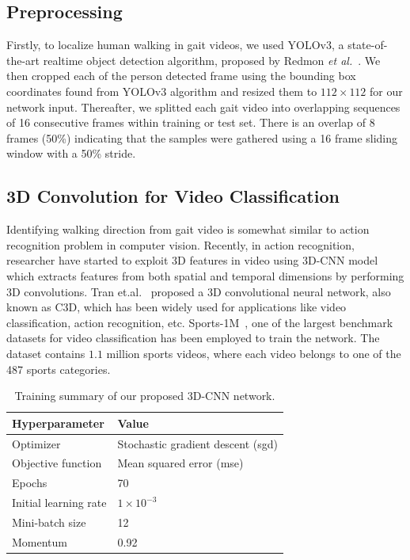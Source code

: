 \subsection{Preprocessing}
Firstly, to localize human walking in gait videos, we used YOLOv3, a state-of-the-art realtime object detection algorithm, proposed by Redmon \textit{et al.}~\cite{Redmon_18}. We then cropped each of the person detected frame using the bounding box coordinates found from YOLOv3 algorithm and resized them to $112\times112$ for our network input. Thereafter, we splitted each gait video into overlapping sequences of 16 consecutive frames within training or test set. There is an overlap of 8 frames (50\%) indicating that the samples were gathered using a 16 frame sliding window with a 50\% stride.


\subsection{3D Convolution for Video Classification}
Identifying walking direction from gait video is somewhat similar to action recognition problem in computer vision. Recently, in action recognition, researcher have started to exploit 3D features in video using 3D-CNN model which extracts features from both spatial and temporal dimensions by performing 3D convolutions. Tran et.al.~\cite{Tran_15} proposed a 3D convolutional neural network, also known as C3D, which has been widely used for applications like video classification, action recognition, etc. Sports-1M~\cite{karpathy_14}, one of the largest benchmark datasets for video classification has been employed to train the network. The dataset contains $ 1.1$ million sports videos, where each video belongs to one of the 487 sports categories. 


\begin{table}
	\centering
	\caption{Training summary of our proposed 3D-CNN network.  \label{table:summary_3dcnn}}
	\begin{tabular*}{30pc}{@{\extracolsep{\fill}}ll@{}}
			\hline \noalign{\vspace{3pt}}
			\textbf{Hyperparameter} & \textbf{Value} \\ \hline\noalign{\vspace{3pt}}
			Optimizer  &Stochastic gradient descent (\gls{sgd})  \\ [3pt]
			Objective function  &Mean squared error (\gls{mse}) \\ [3pt]
			Epochs  &70  \\ [3pt]
			Initial learning rate & $1 \times 10^{-3}$ \\ [3pt]
			Mini-batch size	  &12  \\ [3pt]
			Momentum  &0.92 \\ [3pt]
			\hline
	\end{tabular*}
\end{table}


